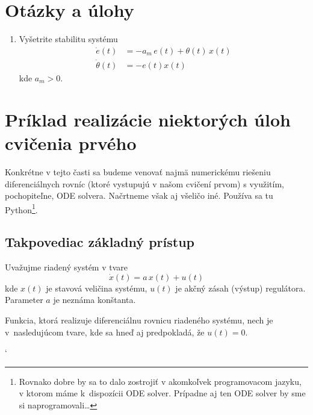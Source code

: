 \documentclass[a4paper, 10pt, ]{article}
\begin{document}
\section{Otázky a úlohy}

\begin{enumerate}[leftmargin=0pt, labelsep=3mm, itemsep=0pt]

	\item Vyšetrite stabilitu systému
	\begin{align*}
		\dot{e}(t) &= -a_m\,e(t) + \theta(t) \, x(t)  \\
		\dot{\theta}(t) &= -e(t) x(t)
	\end{align*}
	kde $a_m > 0$.

\end{enumerate}







\section{Príklad realizácie niektorých úloh cvičenia prvého}

Konkrétne v tejto časti sa budeme venovať najmä numerickému riešeniu diferenciálnych rovníc (ktoré vystupujú v našom cvičení prvom) s využitím, pochopiteľne, ODE solvera. Načrtneme však aj všeličo iné. Používa sa tu Python\footnote{Rovnako dobre by sa to dalo zostrojiť v akomkoľvek programovacom jazyku, v ktorom máme k~dispozícii ODE solver. Prípadne aj ten ODE solver by sme si naprogramovali\ldots}.





\subsection{Takpovediac základný prístup}



Uvažujme riadený systém v tvare
\begin{equation}
	\dot{x}(t) = a\, x(t) + u(t)
\end{equation}
kde $x(t)$ je stavová veličina systému, $u(t)$ je akčný zásah (výstup) regulátora. Parameter $a$ je neznáma konštanta.

Funkcia, ktorá realizuje diferenciálnu rovnicu riadeného systému, nech je v~nasledujúcom tvare, kde sa hneď aj predpokladá, že $u(t)=0$.

{\catcode`

}
\end{document}

